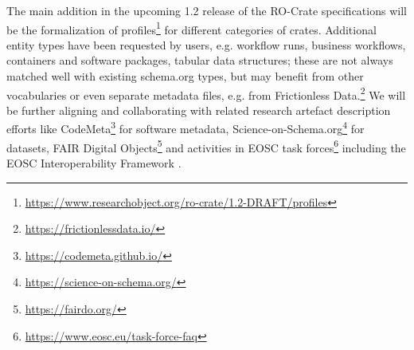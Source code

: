 The main addition in the upcoming 1.2 release of the RO-Crate
specifications will be the formalization of
profiles\footnote{\url{https://www.researchobject.org/ro-crate/1.2-DRAFT/profiles}}
for different categories of crates. Additional entity types have been
requested by users, e.g. workflow runs, business workflows, containers
and software packages, tabular data structures; these are not always
matched well with existing schema.org types, but may benefit from other
vocabularies or even separate metadata files, e.g. from Frictionless
Data.\footnote{\url{https://frictionlessdata.io/}} We will be further aligning
and collaborating with related research artefact description efforts
like CodeMeta\footnote{\url{https://codemeta.github.io/}} for software metadata,
Science-on-Schema.org\footnote{\url{https://science-on-schema.org/}}
\cite{ch5-66} for datasets, FAIR Digital
Objects\footnote{\url{https://fairdo.org/}} \cite{De Smedt 2020} and
activities in EOSC task forces\footnote{\url{https://www.eosc.eu/task-force-faq}}
including the EOSC Interoperability Framework \cite{eosc-interop-framework}.
